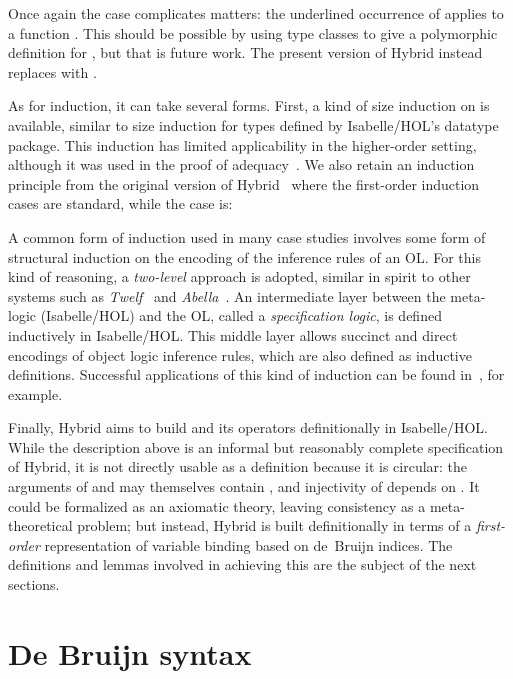 \documentclass[copyright,creativecommons]{eptcs}
\begin{document}
Once again the  case complicates matters: the underlined occurrence
of  applies  to a function
  .
This should be possible by using type classes to give a polymorphic definition
for , but that is future work.  The present version of Hybrid
instead replaces  with
  .

As for induction, it can take several forms.  First, a kind of size
induction on  is available, similar to size induction for
types defined by Isabelle\slash HOL's datatype package.  This
induction has limited applicability in the higher-order setting,
although it was used in the proof of adequacy~\cite{martin:2010a}.
We also retain an induction principle from the original version of
Hybrid~\cite{ambler/crole/momigliano:2002} where the first-order
induction cases are standard, while the  case is:


A common form of induction used in many case studies involves some
form of structural induction on the encoding of the inference rules of
an OL.  For this kind of reasoning, a \emph{two-level} approach is
adopted, similar in spirit to other systems such as
\emph{Twelf}~\cite{pfenning/schurmann:1999} and
\emph{Abella}~\cite{gacek:2008}.  An intermediate layer between the
meta-logic (Isabelle/HOL) and the OL, called a \emph{specification
  logic}, is defined inductively in Isabelle/HOL.  This middle layer
allows succinct and direct encodings of object logic inference rules,
which are also defined as inductive definitions.  
Successful applications of this kind of induction can be found
in~\cite{felty/momigliano:2008,martin:2010a}, for example.

Finally, Hybrid aims to build  and its operators definitionally
in Isabelle\slash HOL.  While the description above is an informal but
reasonably complete specification of Hybrid, it is not directly usable
as a definition because it is circular: the arguments of  and
 may themselves contain , and injectivity of 
depends on .  It could be formalized as an axiomatic theory,
leaving consistency as a meta-theoretical problem; but instead, Hybrid is
built definitionally in terms of a \emph{first-order} representation of
variable binding based on de~Bruijn indices.  The definitions and lemmas
involved in achieving this are the subject of the next sections.


\section{De Bruijn syntax}
\label{sec:hybrid-defn-deBruijn}
\end{document}
